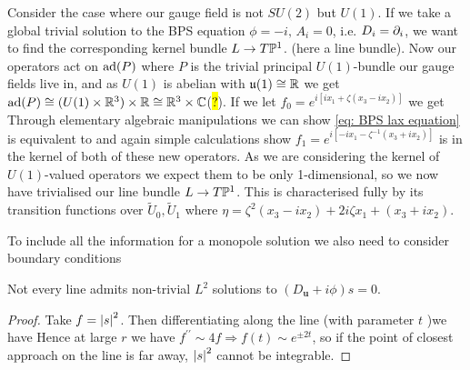 \documentclass{article}
\begin{document}
\begin{example}\label{ex: U(1) kernel bundle}
	Consider the case where our gauge field is not $SU(2)$ but $U(1)$. If we take a global trivial solution to the BPS equation $\phi=-i, \, A_i = 0$, i.e. $D_i = \partial_i$, we want to find the corresponding kernel bundle $L \to T\mathbb{P}^1$. (here a line bundle). Now our operators act on $\operatorname{ad}(P)$ where $P$ is the trivial principal $U(1)$-bundle our gauge fields live in, and as $U(1)$ is abelian with $\mathfrak{u}(1) \cong \mathbb{R}$ we get $\operatorname{ad}(P) \cong (U(1) \times \mathbb{R}^3) \times \mathbb{R} \cong \mathbb{R}^3 \times \mathbb{C}$(\hl{?}). If we let $f_0 = e^{i[ix_1 + \zeta(x_3-ix_2)]}$ we get 
Through elementary algebraic manipulations we can show \ref{eq: BPS lax equation} is equivalent to
and again simple calculations show $f_1 = e^{i[-ix_1 - \zeta^{-1}(x_3+ix_2)]}$ is in the kernel of both of these new operators. As we are considering the kernel of $U(1)$-valued operators we expect them to be only 1-dimensional, so we now have trivialised our line bundle $L \to T\mathbb{P}^1$. This is characterised fully by its transition functions over $\tilde{U}_0, \tilde{U}_1$
where $\eta = \zeta^2(x_3-ix_2)+2i\zeta x_1 + (x_3+ix_2)$. 
\end{example}
To include all the information for a monopole solution we also need to consider boundary conditions
\begin{lemma}
	Not every line admits non-trivial $L^2$ solutions to $(D_{\bm{u}}+i\phi)s=0$.
\end{lemma}
\begin{proof}
	Take $f= \left\lvert s \right\rvert^2$. Then differentiating along the line (with parameter $t$ )we have
Hence at large $r$ we have $f^{\prime\prime}\sim 4f \Rightarrow f(t) \sim e^{\pm 2t}$, so if the point of closest approach on the line is far away, $\left\lvert s \right\rvert^2$ cannot be integrable. 
\end{proof}
\end{document}
